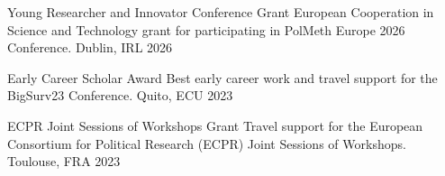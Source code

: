 





\vspace{1mm}

\begin{cvhonors}
\cvhonor
{Young Researcher and Innovator Conference Grant}
{European Cooperation in Science and Technology grant for participating in PolMeth Europe 2026 Conference.}
{Dublin, IRL}
{2026}
\end{cvhonors}

\vspace{1mm}



\begin{cvhonors}
\cvhonor
{Early Career Scholar Award}
{Best early career work and travel support for the BigSurv23 Conference.} %
{Quito, ECU}
{2023}
\end{cvhonors}

\vspace{1mm}

\begin{cvhonors}
\cvhonor
{ECPR Joint Sessions of Workshops Grant}
{Travel support for the European Consortium for Political Research (ECPR) Joint Sessions of Workshops.} %
{Toulouse, FRA}
{2023}
\end{cvhonors}

\vspace{1mm}




